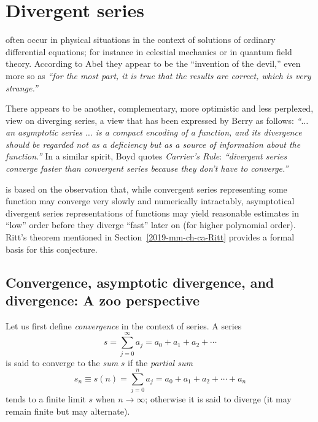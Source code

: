 \chapter{Divergent series}
\label{2011-m-ch-ds}

 often occur
in physical situations in the context of solutions of ordinary differential equations;
for instance in celestial mechanics or in quantum field theory.\cite{Boyd99thedevil,PhysRev.85.631}
According to Abel\cite{Hardy:1949} they
appear to be the ``invention of the devil,'' even more so as\cite{rousseau-2004}  {\em ``for the most part,
it is true that the results are correct, which is very strange.''}

There appears to be another, complementary, more optimistic and less perplexed, view on diverging series,
a view that has been expressed by Berry as follows:\cite{berry-92}
{\em ``$\ldots$ an asymptotic series $\ldots$ is a compact encoding of a function,
and its divergence should be regarded not as a deficiency but as a source of information about the function.''}
In a similar spirit, Boyd quotes {\em Carrier's Rule}:
{\em ``divergent series converge faster than convergent series because they don't have to converge.''}

 is based on the observation that,
while convergent series representing some function
may converge very slowly and numerically intractably,
asymptotical divergent series
representations of functions
may yield reasonable estimates in ``low'' order before they diverge ``fast''
later on (for higher polynomial order).
Ritt's theorem
mentioned in Section~\ref{2019-mm-ch-ca-Ritt}
provides a formal basis for this conjecture.

\section{Convergence, asymptotic divergence, and divergence: A zoo perspective}

Let us first define {\em convergence} in the context of series.
A series
\begin{equation}
s=\sum_{j=0}^\infty a_j =a_0+a_1+a_2+\cdots
\end{equation}
is said to converge to the {\em sum}
$s$ if the {\em partial sum}
\begin{equation}
s_n\equiv s(n)=  \sum_{j=0}^n a_j =a_0+a_1+a_2+\cdots + a_n
\end{equation}
tends to a finite limit $s$ when $n\rightarrow \infty$;
otherwise it is said to diverge (it may remain finite but may alternate).

